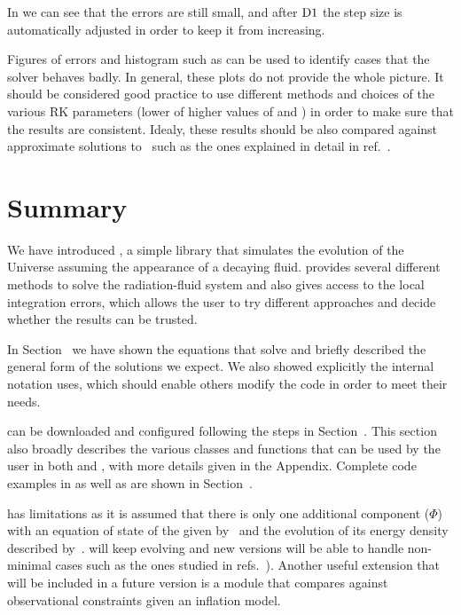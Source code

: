 \documentclass[11pt,a4paper]{article}
\begin{document}
%
In  we can see that the errors are still small, and after ${\rm D1}{}$ the step size is automatically adjusted in order to keep it from increasing.

Figures of errors and histogram such as  can be used to identify cases that the solver behaves badly. In general, these plots do not provide the whole picture. It should be considered good practice to use different methods and choices of the various RK parameters (\eg lower of higher values of  and ) in order to make sure that the results are consistent. Idealy, these results should be also compared against approximate solutions to~ such as the ones explained in detail in ref.~\cite{Arias:2020qty}.

\section{Summary}\label{sec:summary}
%
We have introduced \nsc, a simple library that simulates the evolution of the Universe assuming the appearance of a decaying fluid. \nsc provides several different methods to solve the radiation-fluid system and also gives access to the local integration errors, which allows the user to try different approaches and decide whether the results can be trusted.

In Section~ we have shown the equations that \nsc solve and briefly described the general form of the solutions we expect. We also showed explicitly the internal notation \nsc uses, which should enable others modify the code in order to meet their needs. 

\nsc can be downloaded and configured following the steps in Section~. This section also broadly describes the various classes and functions that can be used by the user in both \CPP and \PY, with more details given in the Appendix. Complete code examples in \CPP as well as \PY are shown in Section~.

\nsc has limitations as it is assumed that there is only one additional component ($\Phi$) with an equation of state of the given by~ and the evolution of its energy density described by~. \nsc will keep evolving and new versions will be able to handle non-minimal cases such as the ones studied in refs.~\cite{Dienes:2021woi,Ahmed:2021fvt,Barman:2022tzk,Arias:2022qjt}). Another useful extension that will be included in a future version is a module that compares against observational constraints given an inflation model. 
\end{document}
